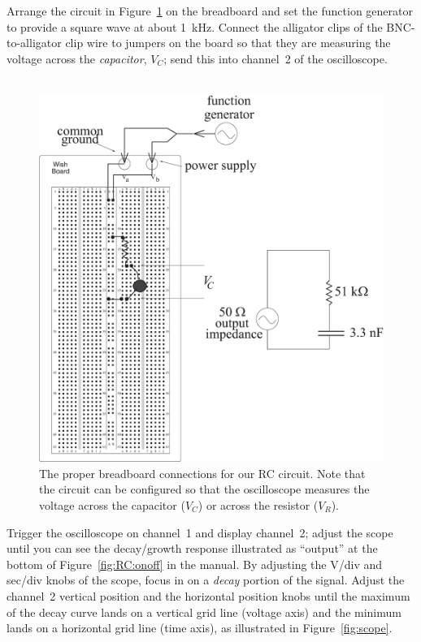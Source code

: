 \noindent Arrange the circuit in Figure~\ref{fig:rcboard} on 
the breadboard and set the 
function generator to provide a square wave at about 1~kHz.  Connect the 
alligator clips of the BNC-to-alligator clip wire to jumpers on the board 
so that they are measuring the voltage across the {\it capacitor}, $V_C$; 
send this into channel~2 of the oscilloscope. \\
\ \\
\clearpage
\begin{figure}[htb]
\epsfxsize=15cm
\centering 
\includegraphics[scale=0.5]{5_rccircuits/rcboard.eps}
\caption{The proper breadboard connections for our RC circuit. Note that the
circuit can be configured so that the oscilloscope measures the voltage across
the capacitor ($V_C$) or across the resistor ($V_R$).} 
\label{fig:rcboard}
\end{figure}

\clearpage

\noindent Trigger the oscilloscope on 
channel~1 and display channel~2; adjust the scope until
you can see the decay/growth response illustrated as ``output'' at the bottom
of Figure~\ref{fig:RC:onoff} in the manual.  By adjusting the V/div and
sec/div knobs of the scope, focus in on a {\it decay} portion of the signal. Adjust the channel~2
vertical position and the horizontal position knobs until the maximum of the 
decay curve lands on a vertical grid line (voltage axis) and the minimum lands 
on a horizontal grid line (time axis), as illustrated in 
Figure~\ref{fig:scope}. \\


